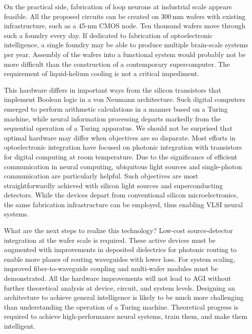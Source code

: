 \documentclass[twocolumn]{article}
\begin{document}
On the practical side, fabrication of loop neurons at industrial scale appears feasible. All the proposed circuits can be created on 300\,mm wafers with existing infrastructure, such as a 45-nm CMOS node. Ten thousand wafers move through such a foundry every day. If dedicated to fabrication of optoelectronic intelligence, a single foundry may be able to produce multiple brain-scale systems per year. Assembly of the wafers into a functional system would probably not be more difficult than the construction of a contemporary supercomputer. The requirement of liquid-helium cooling is not a critical impediment.

This hardware differs in important ways from the silicon transistors that implement Boolean logic in a von Neumann architecture. Such digital computers emerged to perform arithmetic calculations in a manner based on a Turing machine, while neural information processing departs markedly from the sequential operation of a Turing apparatus. We should not be surprised that optimal hardware may differ when objectives are so disparate. Most efforts in optoelectronic integration have focused on photonic integration with transistors for digital computing at room temperature. Due to the significance of efficient communication in neural computing, ubiquitous light sources and single-photon communication are particularly helpful. Such objectives are most straightforwardly achieved with silicon light sources and superconducting detectors. While the devices depart from conventional silicon microelectronics, the same fabrication infrastructure can be employed, thus enabling VLSI neural systems. 

What are the next steps to realize this technology? Low-cost source-detector integration at the wafer scale is required. These active devices must be augmented with improvements in deposited dielectrics for photonic routing to enable more planes of routing waveguides with lower loss. For system scaling, improved fiber-to-waveguide coupling and multi-wafer modules must be demonstrated. All the hardware improvements will not lead to AGI without further theoretical analysis at device, circuit, and system levels. Designing an architecture to achieve general intelligence is likely to be much more challenging than understanding the operation of a Turing machine. Theoretical progress is required to achieve high-performance neural systems, train them, and make them intelligent.



\end{document}
